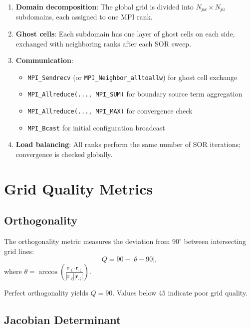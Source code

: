 \documentclass[11pt,a4paper]{report}
\newcommand{\rvec}{\bm{r}}
\begin{document}
\begin{enumerate}
    \item \textbf{Domain decomposition}: The global grid is divided into $N_{px} \times N_{pz}$ subdomains, each assigned to one MPI rank.
    \item \textbf{Ghost cells}: Each subdomain has one layer of ghost cells on each side, exchanged with neighboring ranks after each SOR sweep.
    \item \textbf{Communication}:
    \begin{itemize}
        \item \texttt{MPI\_Sendrecv} (or \texttt{MPI\_Neighbor\_alltoallw}) for ghost cell exchange
        \item \texttt{MPI\_Allreduce(..., MPI\_SUM)} for boundary source term aggregation
        \item \texttt{MPI\_Allreduce(..., MPI\_MAX)} for convergence check
        \item \texttt{MPI\_Bcast} for initial configuration broadcast
    \end{itemize}
    \item \textbf{Load balancing}: All ranks perform the same number of SOR iterations; convergence is checked globally.
\end{enumerate}

\chapter{Grid Quality Metrics}

\section{Orthogonality}

The orthogonality metric measures the deviation from $90^\circ$ between intersecting grid lines:
\begin{equation}
    Q = 90 - |\theta - 90|,
\end{equation}
where $\theta = \arccos\left( \frac{\rvec_{,\xi} \cdot \rvec_{,\zeta}}{|\rvec_{,\xi}| |\rvec_{,\zeta}|} \right)$.

Perfect orthogonality yields $Q = 90$. Values below $45$ indicate poor grid quality.

\section{Jacobian Determinant}
\end{document}
